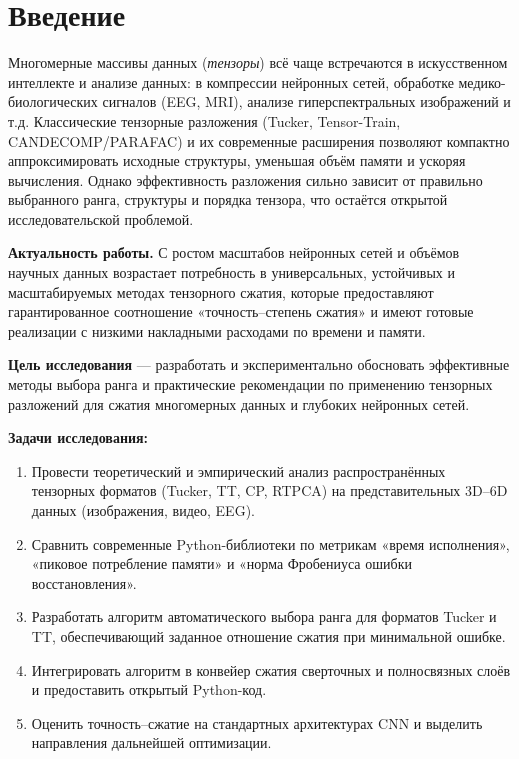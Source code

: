 \chapter{Введение}
\label{chap:intro}


Многомерные массивы данных (\emph{тензоры}) всё чаще встречаются в искусственном интеллекте и анализе данных: в компрессии нейронных сетей, обработке медико-биологических сигналов (EEG, MRI), анализе гиперспектральных изображений и т.д. Классические тензорные разложения (Tucker, Tensor-Train, CANDECOMP/PARAFAC) и их современные расширения позволяют компактно аппроксимировать исходные структуры, уменьшая объём памяти и ускоряя вычисления. Однако эффективность разложения сильно зависит от правильно выбранного ранга, структуры и порядка тензора, что остаётся открытой исследовательской проблемой.  

\textbf{Актуальность работы.}  
С ростом масштабов нейронных сетей и объёмов научных данных возрастает потребность в универсальных, устойчивых и масштабируемых методах тензорного сжатия, которые предоставляют гарантированное соотношение «точность–степень сжатия» и имеют готовые реализации с низкими накладными расходами по времени и памяти.

\textbf{Цель исследования} — разработать и экспериментально обосновать эффективные методы выбора ранга и практические рекомендации по применению тензорных разложений для сжатия многомерных данных и глубоких нейронных сетей.

\textbf{Задачи исследования:}
\begin{enumerate}
  \item Провести теоретический и эмпирический анализ распространённых тензорных форматов (Tucker, TT, CP, RTPCA) на представительных 3D–6D данных (изображения, видео, EEG).  
  \item Сравнить современные Python-библиотеки по метрикам «время исполнения», «пиковое потребление памяти» и «норма Фробениуса ошибки восстановления».  
  \item Разработать алгоритм автоматического выбора ранга для форматов Tucker и TT, обеспечивающий заданное отношение сжатия при минимальной ошибке.  
  \item Интегрировать алгоритм в конвейер сжатия сверточных и полносвязных слоёв и предоставить открытый Python-код.  
  \item Оценить точность–сжатие на стандартных архитектурах CNN и выделить направления дальнейшей оптимизации.
\end{enumerate}

